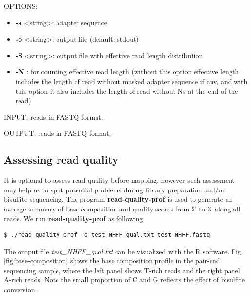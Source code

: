 \documentclass{article}
\begin{document}
OPTIONS:
\begin{itemize}
\item
\textbf{-a} \textless string\textgreater : adapter sequence
\item
\textbf{-o} \textless string\textgreater : output file (default: stdout) 
\item
\textbf{-S} \textless string\textgreater : output file with effective read length distribution
\item
\textbf{-N} : for counting effective read length (without this option effective length includes
the length of read without masked adapter sequence if any, and with this option it also includes
the length of read without Ns at the end of the read)
\end{itemize}

INPUT: reads in FASTQ format.

OUTPUT: reads in FASTQ format.

\subsection{Assessing read quality}
\label{sec:read-qual-assessm}
It is optional to assess read quality before mapping, however such
assessment may help us to spot potential problems during library
preparation and/or bisulfite sequencing. The program
\textbf{read-quality-prof} is used to generate an average summary of
base composition and quality scores from 5' to 3' along all
reads.  We run \textbf{read-quality-prof} as following 
\begin{verbatim}
$ ./read-quality-prof -o test_NHFF_qual.txt test_NHFF.fastq
\end{verbatim}

The output file \textit{test\_NHFF\_qual.txt} can be visualized with the R software.
Fig. \ref{fig:base-composition} shows the base composition profile in
the pair-end sequencing sample, where the left panel shows  T-rich
reads and the right panel A-rich reads. Note the small proportion of C
and G reflects the effect of bisulfite conversion.
\end{document}

